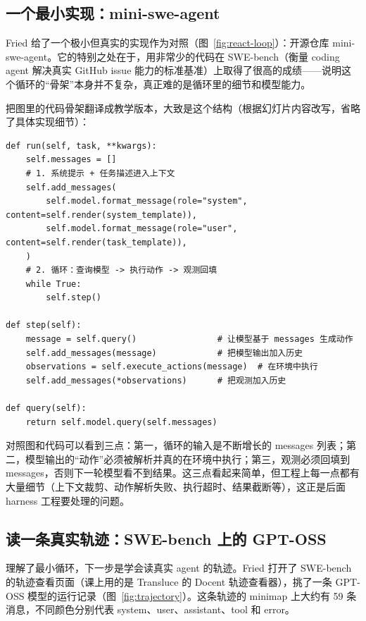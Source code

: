 \documentclass[a4paper]{article}
\begin{document}
\subsection{一个最小实现：mini-swe-agent}

Fried 给了一个极小但真实的实现作为对照（图~\ref{fig:react-loop}）：开源仓库 mini-swe-agent。它的特别之处在于，用非常少的代码在 SWE-bench（衡量 coding agent 解决真实 GitHub issue 能力的标准基准）上取得了很高的成绩——说明这个循环的“骨架”本身并不复杂，真正难的是循环里的细节和模型能力。

把图里的代码骨架翻译成教学版本，大致是这个结构（根据幻灯片内容改写，省略了具体实现细节）：

\noindent\begin{minipage}{\linewidth}
\begin{lstlisting}[caption={最小 ReAct 循环的骨架（依据 mini-swe-agent 的幻灯片改写）},label={lst:react-loop}]
def run(self, task, **kwargs):
    self.messages = []
    # 1. 系统提示 + 任务描述进入上下文
    self.add_messages(
        self.model.format_message(role="system", content=self.render(system_template)),
        self.model.format_message(role="user", content=self.render(task_template)),
    )
    # 2. 循环：查询模型 -> 执行动作 -> 观测回填
    while True:
        self.step()

def step(self):
    message = self.query()                # 让模型基于 messages 生成动作
    self.add_messages(message)            # 把模型输出加入历史
    observations = self.execute_actions(message)  # 在环境中执行
    self.add_messages(*observations)      # 把观测加入历史

def query(self):
    return self.model.query(self.messages)
\end{lstlisting}
\end{minipage}

对照图和代码可以看到三点：第一，循环的输入是不断增长的 messages 列表；第二，模型输出的“动作”必须被解析并真的在环境中执行；第三，观测必须回填到 messages，否则下一轮模型看不到结果。这三点看起来简单，但工程上每一点都有大量细节（上下文裁剪、动作解析失败、执行超时、结果截断等），这正是后面 harness 工程要处理的问题。

\subsection{读一条真实轨迹：SWE-bench 上的 GPT-OSS}

理解了最小循环，下一步是学会读真实 agent 的轨迹。Fried 打开了 SWE-bench 的轨迹查看页面（课上用的是 Transluce 的 Docent 轨迹查看器），挑了一条 GPT-OSS 模型的运行记录（图~\ref{fig:trajectory}）。这条轨迹的 minimap 上大约有 59 条消息，不同颜色分别代表 system、user、assistant、tool 和 error。
\end{document}
